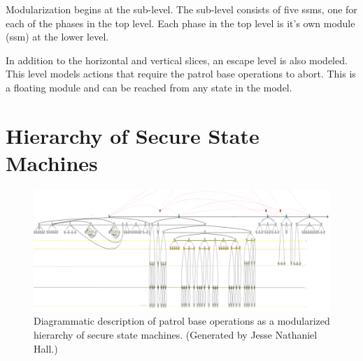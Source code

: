 \documentclass[../../main/main.tex]{subfiles}
\begin{document}
Modularization begins at the sub-level.  The sub-level consists of five \gls{ssm}s, one for each of the phases in the top level.  Each phase in the top level is it's own module (\gls{ssm}) at the lower level.  


%

In addition to the horizontal and vertical slices, an escape level is also modeled.  This level models actions that require the patrol base operations to abort.  This is a floating module and can be reached from any state in the model.  


\section{Hierarchy of Secure State Machines}
\begin{figure}[h]
\includegraphics[width=\textwidth]{../figures/overalldiagramsquashed}
\caption{\label{overalldiagramsquashed}Diagrammatic description of patrol base operations as a modularized hierarchy of secure state machines.  (Generated by Jesse Nathaniel Hall.)}
\end{figure}
\end{document}
